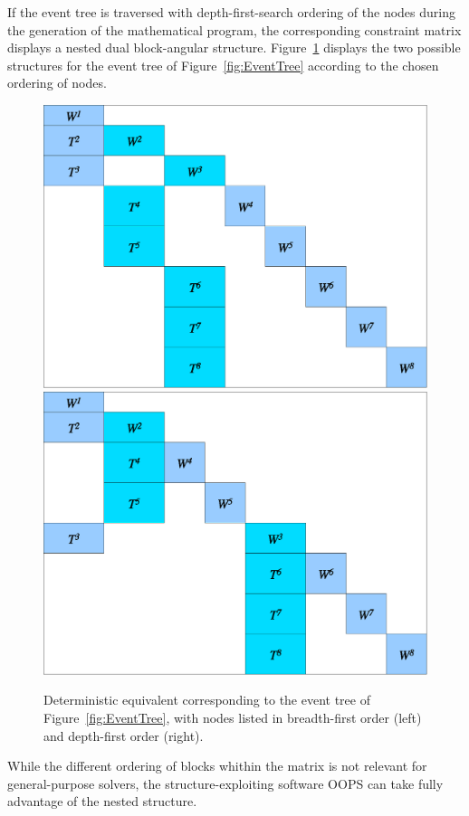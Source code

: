 If the event tree is traversed with depth-first-search ordering of the 
nodes during the generation of the mathematical program, the 
corresponding constraint matrix displays a nested dual block-angular 
structure.
Figure~\ref{fig:deteq} displays the two possible structures 
for the event tree of Figure~\ref{fig:EventTree} according 
to the chosen ordering of nodes.
%
\begin{figure}[ht]
  \begin{center}
    \includegraphics[scale=0.36]{figures/deteq-bfs.eps} \hspace{1cm}
    \includegraphics[scale=0.36]{figures/deteq-dfs.eps}
    \caption{Deterministic equivalent corresponding to the event tree 
             of Figure~\ref{fig:EventTree}, with nodes listed in breadth-first 
             order (left) and depth-first order (right).}
    \label{fig:deteq}
  \end{center}
  \vspace{-3ex}
\end{figure}
%
While the different ordering of blocks whithin the matrix is not 
relevant for general-purpose solvers, the
structure-exploiting software OOPS \cite{GondzioSarkissian} can take 
fully advantage of the nested structure.

